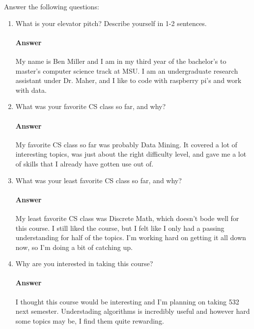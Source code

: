 \documentclass{article}
\begin{document}
Answer the following questions:
\begin{enumerate}
      \item What is your elevator pitch?  Describe yourself in 1-2
            sentences.
            
            \paragraph{Answer} My name is Ben Miller and I am in my third year of the bachelor's to master's 
            computer science track at MSU. I am an undergraduate research assistant under Dr. Maher, and I like to
            code with raspberry pi's and work with data.
            
      \item What was your favorite CS class so far, and why?
            
            \paragraph{Answer} My favorite CS class so far was probably Data Mining. It covered a lot of interesting topics,
            was just about the right difficulty level, and gave me a lot of skills that I already have gotten use out of.
            
      \item What was your least favorite CS class so far, and why?
            
            \paragraph{Answer} My least favorite CS class was Discrete Math, which doesn't bode well for this course.
            I still liked the course, but I felt like I only had a passing understanding for half of the topics.
            I'm working hard on getting it all down now, so I'm doing a bit of catching up.
            
      \item Why are you interested in taking this course?
            
            \paragraph{Answer} I thought this course would be interesting and I'm planning on taking 532 next semester.
            Understading algorithms is incredibly useful and however hard some topics may be, I find them quite rewarding.
            

\end{enumerate}
\end{document}
